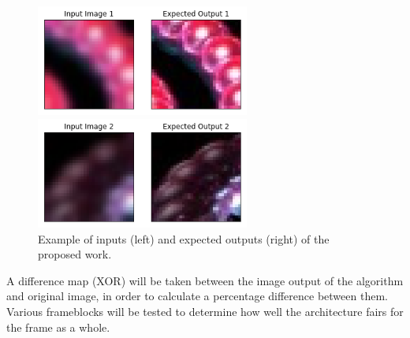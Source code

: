 \documentclass[letterpaper]{article} %
\begin{document}
\begin{figure}[htbp]
\centerline{\includegraphics[width=7cm]{training_pair_1.png}}
\centerline{\includegraphics[width=7cm]{training_pair_2.png}}
\caption{Example of inputs (left) and expected outputs (right) of the proposed work.}
\label{fig:training_pair}
\end{figure}

A difference map (XOR) will be taken between the image output of the algorithm
and original image, in order to calculate a percentage difference between them.
Various frameblocks will be tested to determine how well the architecture fairs for the frame
as a whole.
\end{document}
